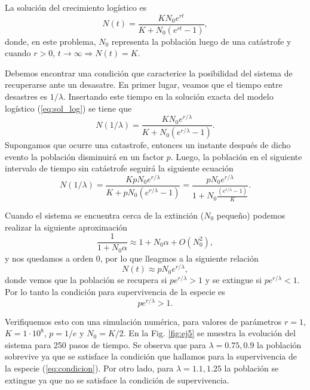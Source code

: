 \documentclass[letterpaper,12pt]{article}
\theoremstyle{plain}
\begin{document}
La solución del crecimiento logístico es
\begin{equation}
    N(t) = \frac{K N_0 e^{rt}}{K + N_0(e^{rt} - 1)},
    \label{eq:sol_log}
\end{equation}
donde, en este problema, $N_0$ representa la población luego de una catástrofe y cuando $r>0$, $t\rightarrow\infty \Rightarrow N(t) = K$. 

Debemos encontrar una condición que caracterice la posibilidad del sistema de recuperarse ante un desasatre. En primer lugar, veamos que el tiempo entre desastres es $1/\lambda$. Insertando este tiempo en la solución exacta del modelo logístico (\ref*{eq:sol_log}) se tiene que 
\begin{equation}
    N(1/\lambda) = \frac{K N_0 e^{r/\lambda}}{K + N_0(e^{r/\lambda} - 1)}.
\end{equation}
Supongamos que ocurre una catastrofe, entonces un instante después de dicho evento la población disminuirá en un factor $p$. Luego, la población en el siguiente intervalo de tiempo sin catástrofe seguirá la siguiente ecuación
\begin{equation}
    N(1/\lambda) = \frac{K p N_0 e^{r/\lambda}}{K + p N_0 (e^{r/\lambda} - 1)} = \frac{p N_0 e^{r/\lambda}}{1 + N_0 \frac{(e^{r/\lambda} - 1)}{K}     } .
\end{equation}

Cuando el sistema se encuentra cerca de la extinción ($N_0$ pequeño) podemos realizar la siguiente aproximación 
\begin{equation}
    \frac{1}{1 + N_0 \alpha} \approx 1 + N_0 \alpha + O(N_0^2),
\end{equation}
y nos quedamos a orden 0, por lo que lleagmos a la siguiente relación
\begin{equation}
    N(t) \approx p N_0 e^{r/\lambda},
\end{equation}
donde vemos que la población se recupera si $p e^{r/\lambda} > 1$ y se extingue si $p e^{r/\lambda} < 1$. Por lo tanto la condición para supervivencia de la especie es 
\begin{equation}
    p e^{r/\lambda} > 1.
    \label{eq:condicion}
\end{equation}

Verifiquemos esto con una simulación numérica, para valores de parámetros $r=1$, $K=1\cdot 10^8$, $p=1/e$ y $N_0=K/2$. En la Fig. \ref*{fig:ej5} se muestra la evolución del sistema para 250 pasos de tiempo. Se observa que para $\lambda = 0.75,0.9$ la población sobrevive ya que se satisface la condición que hallamos para la supervivencia de la especie (\ref*{eq:condicion}). Por otro lado, para $\lambda = 1.1,1.25$ la población se extingue ya que no se satisface la condición de supervivencia.
\end{document}
